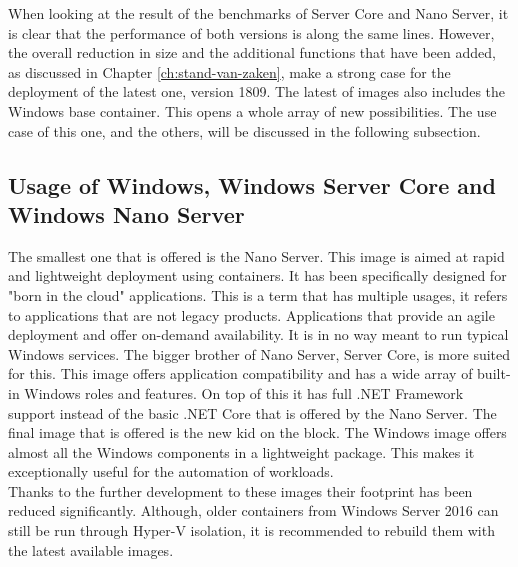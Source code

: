  When looking at the result of the benchmarks of Server Core and Nano Server, it is clear that the performance of both versions is along the same lines. However, the overall reduction in size and the additional functions that have been added, as discussed in Chapter \ref{ch:stand-van-zaken}, make a strong case for the deployment of the latest one, version 1809. The latest of images also includes the Windows base container. This opens a whole array of new possibilities. The use case of this one, and the others, will be discussed in the following subsection.

\subsection{Usage of Windows, Windows Server Core and Windows Nano Server}
The smallest one that is offered is the Nano Server. This image is aimed at rapid and lightweight deployment using containers. It has been specifically designed for "born in the cloud" applications. This is a term that has multiple usages, it refers to applications that are not legacy products. Applications that provide an agile deployment and offer on-demand availability. It is in no way meant to run typical Windows services. The bigger brother of Nano Server, Server Core, is more suited for this. 
This image offers application compatibility and has a wide array of built-in Windows roles and features. On top of this it has full .NET Framework support instead of the basic .NET Core that is offered by the Nano Server. 
The final image that is offered is the new kid on the block. The Windows image offers almost all the Windows components in a lightweight package. This makes it exceptionally useful for the automation of workloads. 
\\
Thanks to the further development to these images their footprint has been reduced significantly. Although, older containers from Windows Server 2016 can still be run through Hyper-V isolation, it is recommended to rebuild them with the latest available images.




